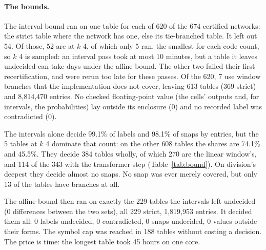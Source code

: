 \documentclass[11pt]{article}
\newcommand{\pn}[2]{#2}
\theoremstyle{definition}
\begin{document}
\paragraph{The bounds.} The interval bound ran on one table for each of \pn{bound-networks}{620} of the
\pn{recert-certified-networks}{674} certified networks: the strict table where the network has one, else
its tie-branched table. It left out \pn{bound-left}{54}. Of those, \pn{bound-left-long}{52} are at $k$ 4, of
which only \pn{bound-long}{5} ran, the smallest for each code count, so $k$ 4 is sampled: an interval pass
took at most \pn{bound-long-minutes}{10} minutes, but a table it leaves undecided can take days under the
affine bound. The other two failed their first recertification, and were rerun too late for these passes. Of the
\pn{bound-networks}{620}, \pn{bound-unsupported}{7} use window branches that the implementation does not
cover, leaving \pn{bound-tables}{613} tables (\pn{bound-strict}{369} strict) and
\pn{bound-entries}{8{,}814{,}470} entries. No checked floating-point value (the cells' outputs and, for
intervals, the probabilities) lay outside its enclosure (\pn{bound-outside}{0}) and no recorded label was
contradicted (\pn{bound-contradicted}{0}).

The intervals alone decide \pn{bound-labels-percent}{99.1}\% of labels and \pn{bound-snaps-percent}{98.1}\%
of snaps by entries, but the \pn{bound-long}{5} tables at $k$ 4 dominate that count: on the other
\pn{bound-rest-tables}{608} tables the shares are \pn{bound-rest-labels-percent}{74.1}\% and
\pn{bound-rest-snaps-percent}{45.5}\%. They decide \pn{bound-full}{384} tables wholly, of which
\pn{linear-bound-full}{270} are the linear window's, and \pn{bound-transformer-full}{114} of the
\pn{bound-transformer-tables}{343} with the transformer step (Table~\ref{tab:bound}). On division's deepest
they decide almost no snaps. No snap was ever merely covered, but only \pn{bound-branch-tables}{13} of the
tables have branches at all.

The affine bound then ran on exactly the \pn{affine-tables}{229} tables the intervals left undecided
(\pn{affine-mismatch}{0} differences between the two sets), all \pn{affine-strict}{229} strict,
\pn{affine-entries}{1{,}819{,}953} entries. It decided them all: \pn{affine-labels-undecided}{0} labels
undecided, \pn{affine-labels-contradicted}{0} contradicted, \pn{affine-snaps-uncovered}{0} snaps undecided,
\pn{affine-outside}{0} values outside their forms. The symbol cap was reached in
\pn{affine-capped-tables}{188} tables without costing a decision. The price is time: the longest table took
\pn{affine-longest-hours}{45} hours on one core.
\end{document}
